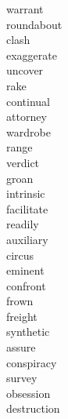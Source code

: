 \documentclass[a4paper, 11pt]{ctexart}
\begin{document}
\begin{multicols*}{3}
\begin{description}
\item[warrant]

\item[roundabout]

\item[clash]

\item[exaggerate]

\item[uncover]

\item[rake]

\item[continual]

\item[attorney]

\item[wardrobe]

\item[range]

\item[verdict]

\item[groan]

\item[intrinsic]

\item[facilitate]

\item[readily]

\item[auxiliary]

\item[circus]

\item[eminent]

\item[confront]

\item[frown]

\item[freight]

\item[synthetic]

\item[assure]

\item[conspiracy]

\item[survey]

\item[obsession]

\item[destruction]


\end{description}
\end{multicols*}
\end{document}
